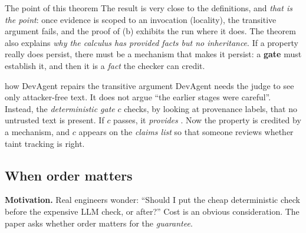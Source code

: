 \begin{warning}{The point of this theorem}
The result is very close to the definitions, and \emph{that is the point}: once evidence is scoped to an invocation (locality), the transitive argument fails, and the proof of (b) exhibits the run where it does. The theorem also explains \emph{why the calculus has provided facts but no inheritance}. If a property really does persist, there must be a mechanism that makes it persist: a \textbf{gate} must establish it, and then it is a \emph{fact} the checker can credit.
\end{warning}

\begin{example}{how DevAgent repairs the transitive argument}
DevAgent needs the judge to see only attacker-free text. It does not argue ``the earlier stages were careful''. Instead, the \emph{deterministic gate} $c$ checks, by looking at provenance labels, that no untrusted text is present. If $c$ passes, it \emph{provides} . Now the property is credited by a mechanism, and $c$ appears on the \emph{claims list} so that someone reviews whether taint tracking is right.
\end{example}


\subsection{When order matters}

\textbf{Motivation.} Real engineers wonder: ``Should I put the cheap deterministic check before the expensive LLM check, or after?'' Cost is an obvious consideration. The paper asks whether order matters for the \emph{guarantee}.

